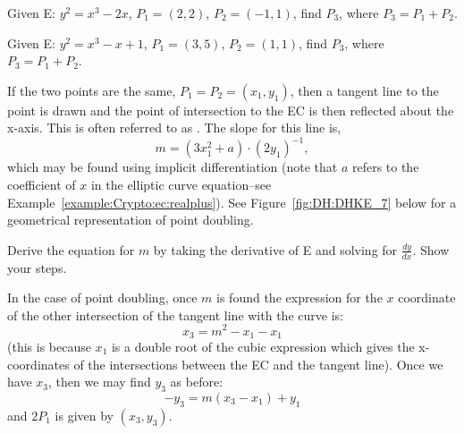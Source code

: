 \begin{exercise}{} Given E: $y^2 = x^3 - 2x$, $P_1 = (2, 2)$, $P_2 = (-1, 1)$, find $P_3$, where $P_3 = P_1 + P_2$.
\end{exercise}

\begin{exercise}{} Given E: $y^2 = x^3 - x + 1$, $P_1 = (3, 5)$, $P_2 = (1, 1)$, find $P_3$, where $P_3 = P_1 + P_2$.
\end{exercise}

If the two points are the same, $P_1 = P_2 = (x_1,y_1)$, then a tangent line to the point is drawn and the point of intersection to the EC is then reflected about the x-axis.  This is often referred to as . The slope for this line is, 
\[m = (3x_1^2 + a) \cdot (2y_1)^{-1},\] 
which may be found using implicit differentiation (note that $a$ refers to the coefficient of $x$ in the elliptic curve equation--see Example~\ref{example:Crypto:ec:realplus}).  See Figure~\ref{fig:DH:DHKE_7} below for a geometrical representation of point doubling.

\begin{exercise}{}
Derive the equation for $m$ by taking the derivative of E and solving for $\frac{dy}{dx}$. Show your steps.
\end{exercise}

In the case of point doubling, once $m$ is found the expression for  the $x$ coordinate of the other intersection of the tangent line with the curve is:
\[ x_3 = m^2 - x_1 - x_1\]
(this is because $x_1$ is a double root of the cubic expression which gives the x-coordinates of the intersections between the EC and the tangent line). Once we have $x_3$, then we may find $y_3$ as before:
\[ -y_3 = m(x_3-x_1) + y_1 \]
and $2P_1$ is given by $(x_3,y_3)$.

